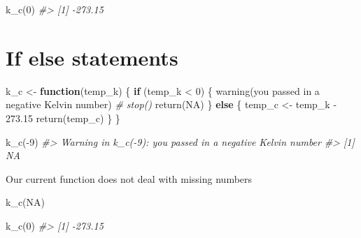 \documentclass[
]{book}
\newenvironment{Shaded}{\begin{snugshade}}{\end{snugshade}}
\newcommand{\CommentTok}[1]{\textcolor[rgb]{0.56,0.35,0.01}{\textit{#1}}}
\newcommand{\ConstantTok}[1]{\textcolor[rgb]{0.00,0.00,0.00}{#1}}
\newcommand{\ControlFlowTok}[1]{\textcolor[rgb]{0.13,0.29,0.53}{\textbf{#1}}}
\newcommand{\DecValTok}[1]{\textcolor[rgb]{0.00,0.00,0.81}{#1}}
\newcommand{\FloatTok}[1]{\textcolor[rgb]{0.00,0.00,0.81}{#1}}
\newcommand{\FunctionTok}[1]{\textcolor[rgb]{0.00,0.00,0.00}{#1}}
\newcommand{\NormalTok}[1]{#1}
\newcommand{\OtherTok}[1]{\textcolor[rgb]{0.56,0.35,0.01}{#1}}
\newcommand{\SpecialCharTok}[1]{\textcolor[rgb]{0.00,0.00,0.00}{#1}}
\newcommand{\StringTok}[1]{\textcolor[rgb]{0.31,0.60,0.02}{#1}}
\begin{document}
\begin{Shaded}
\begin{Highlighting}[]
\FunctionTok{k\_c}\NormalTok{(}\DecValTok{0}\NormalTok{)}
\CommentTok{\#\textgreater{} [1] {-}273.15}
\end{Highlighting}
\end{Shaded}

\hypertarget{if-else-statements}{%
\section{If else statements}\label{if-else-statements}}

\begin{Shaded}
\begin{Highlighting}[]
\NormalTok{k\_c }\OtherTok{\textless{}{-}} \ControlFlowTok{function}\NormalTok{(temp\_k) \{}
    \ControlFlowTok{if}\NormalTok{ (temp\_k }\SpecialCharTok{\textless{}} \DecValTok{0}\NormalTok{) \{}
        \FunctionTok{warning}\NormalTok{(}\StringTok{\textquotesingle{}you passed in a negative Kelvin number\textquotesingle{}}\NormalTok{)}
        \CommentTok{\# stop()}
        \FunctionTok{return}\NormalTok{(}\ConstantTok{NA}\NormalTok{)}
\NormalTok{    \} }\ControlFlowTok{else}\NormalTok{ \{}
\NormalTok{        temp\_c }\OtherTok{\textless{}{-}}\NormalTok{ temp\_k }\SpecialCharTok{{-}} \FloatTok{273.15}
        \FunctionTok{return}\NormalTok{(temp\_c)}
\NormalTok{    \}}
\NormalTok{\}}
\end{Highlighting}
\end{Shaded}

\begin{Shaded}
\begin{Highlighting}[]
\FunctionTok{k\_c}\NormalTok{(}\SpecialCharTok{{-}}\DecValTok{9}\NormalTok{)}
\CommentTok{\#\textgreater{} Warning in k\_c({-}9): you passed in a negative Kelvin number}
\CommentTok{\#\textgreater{} [1] NA}
\end{Highlighting}
\end{Shaded}

Our current function does not deal with missing numbers

\begin{Shaded}
\begin{Highlighting}[]
\FunctionTok{k\_c}\NormalTok{(}\ConstantTok{NA}\NormalTok{)}
\end{Highlighting}
\end{Shaded}

\begin{Shaded}
\begin{Highlighting}[]
\FunctionTok{k\_c}\NormalTok{(}\DecValTok{0}\NormalTok{)}
\CommentTok{\#\textgreater{} [1] {-}273.15}
\end{Highlighting}
\end{Shaded}
\end{document}
